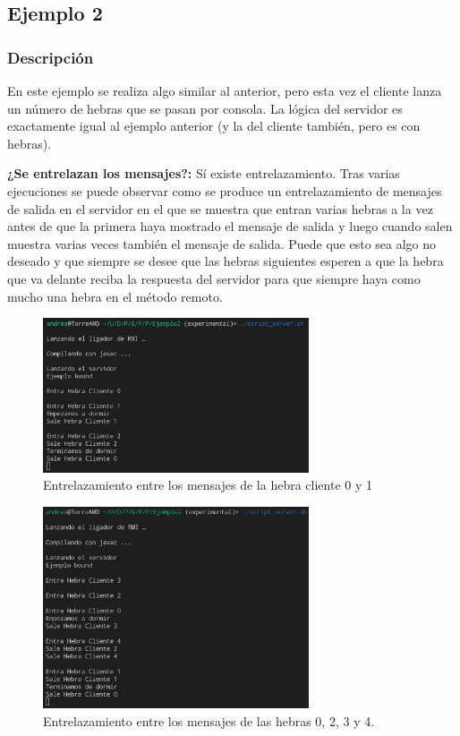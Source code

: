 \documentclass{article}
\begin{document}
\subsection{Ejemplo 2}
\subsubsection{Descripción}
En este ejemplo se realiza algo similar al anterior, pero esta vez el cliente lanza un número de hebras que se pasan por consola. La lógica del servidor es exactamente igual al ejemplo anterior (y la del cliente también, pero es con hebras).

\textbf{¿Se entrelazan los mensajes?: }Sí existe entrelazamiento. Tras varias ejecuciones se puede observar como se produce un entrelazamiento de mensajes de salida en el servidor en el que se muestra que entran varias hebras a la vez antes de que la primera haya mostrado el mensaje de salida y luego cuando salen muestra varias veces también el mensaje de salida. Puede que esto sea algo no deseado y que siempre se desee que las hebras siguientes esperen a que la hebra que va delante reciba la respuesta del servidor para que siempre haya como mucho una hebra en el método remoto.

\begin{figure}[H]
    \centering
    \includegraphics[width=0.7\textwidth]{imagenes/E2Server1.png}
    \caption{Entrelazamiento entre los mensajes de la hebra cliente 0 y 1}
\end{figure}

\begin{figure}[H]
    \centering
    \includegraphics[width=0.7\textwidth]{imagenes/E2Server2.png}
    \caption{Entrelazamiento entre los mensajes de las hebras 0, 2, 3 y 4.}
\end{figure}
\end{document}
